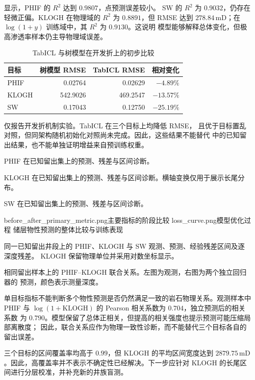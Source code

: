显示，PHIF 的 $R^2$ 达到 $0.9807$，点预测误差较小。
SW 的 $R^2$ 为 $0.9032$，仍存在
轻微正偏。KLOGH 在物理域的 $R^2$ 为 $0.8891$，但 RMSE 达到
$278.84\,\mathrm{mD}$；在 $\log(1+y)$ 训练域中，其 $R^2$ 为 $0.9130$。这说明
模型能够解释总体变化，但极高渗透率样本仍主导物理域误差。

\begin{table}[htbp]
  \centering
  \caption{TabICL 与树模型在开发折上的初步比较}
  \label{tab:property-tabicl}
  \begin{tabular}{lrrr}
    \toprule
    目标 & 树模型 RMSE & TabICL RMSE & 相对变化 \\
    \midrule
    PHIF & 0.02764 & 0.02629 & $-4.89\%$ \\
    KLOGH & 542.9026 & 469.2547 & $-13.57\%$ \\
    SW & 0.17043 & 0.12750 & $-25.19\%$ \\
    \bottomrule
  \end{tabular}
\end{table}

仅报告开发折机制实验。TabICL 在三个目标上均降低 RMSE，
且优于目标置乱对照，但同架构随机初始化对照尚未完成。因此，这些结果不能替代
中的已知留出结果，也不能单独证明增益来自预训练权重。

  {PHIF 在已知留出集上的预测、残差与区间诊断。}

  {KLOGH 在已知留出集上的预测、残差与区间诊断。横轴变换仅用于展示长尾分布。}

  {SW 在已知留出集上的预测、残差与区间诊断。}

  {before_after_primary_metric.png}{主要指标的阶段比较}
  {loss_curve.png}{模型优化过程}
  {储层物性预测的整体比较与训练表现}

  {同一已知留出井段上的 PHIF、KLOGH 与 SW 观测、预测、经验残差区间及逐深度残差。
  KLOGH 保留物理单位并采用对数坐标显示。}

  {相同留出样本上的 PHIF--KLOGH 联合关系。左图为观测，右图为两个独立回归器的
  预测，颜色表示测量深度。}

单目标指标不能判断多个物性预测是否仍然满足一致的岩石物理关系。观测样本中 PHIF
与 $\log(1+\mathrm{KLOGH})$ 的 Pearson 相关系数为 $0.704$，独立预测后的相关系数
为 $0.790$。模型保留了总体正相关，但提高的相关强度也提示预测可能压缩局部离散度；
因此，联合关系应作为物理一致性诊断，而不能替代三个目标各自的留出误差。

三个目标的区间覆盖率均高于 $0.99$，但 KLOGH 的平均区间宽度达到
$2879.75\,\mathrm{mD}$。因此，高覆盖率并不表示不确定性已经解决。下一步应针对
KLOGH 的长尾区间进行分层校准，并补充新的井族盲测。

\FloatBarrier
